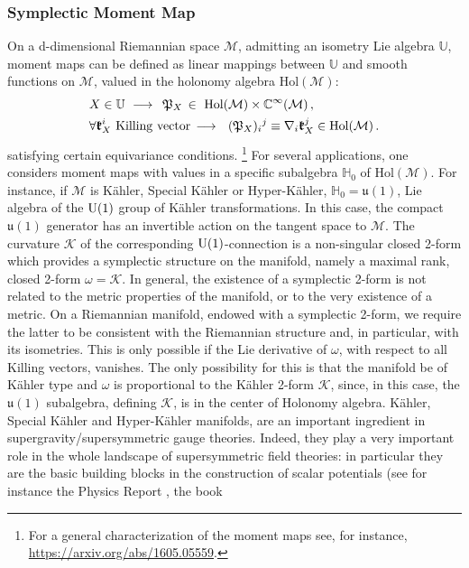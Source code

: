 \documentclass[10pt,a4paper]{article}
\begin{document}
\subsubsection{Symplectic Moment Map} {On a d-dimensional Riemannian space $\mathcal{M}$, admitting an isometry Lie algebra $\mathbb{U}$, moment maps can be defined as linear mappings between $\mathbb{U}$ and  smooth functions on $\mathcal{M}$, valued in the holonomy algebra $\mathrm{Hol}(\mathcal{M})$:
\begin{align}
&X\in \mathbb{U}\,\,\longrightarrow \,\,\,\mathfrak{P}_X\,\in \,\,\mathrm{Hol}(\mathcal{M})\times \mathbb{C}^\infty(\mathcal{M})\,,\nonumber\\
&\forall \boldsymbol{\mathfrak{k}}^i_X\,\,{\rm Killing\,\,vector}\,\longrightarrow\,\,\,\,(\mathfrak{P}_X)_i{}^j\equiv \nabla_i\boldsymbol{\mathfrak{k}}^j_X\in \mathrm{Hol}(\mathcal{M})\,.\end{align}
satisfying certain equivariance conditions. \footnote{{ For a general characterization of the moment maps see, for instance,} \url{https://arxiv.org/abs/1605.05559}.} For several applications, one considers moment maps with values in a specific subalgebra $\mathbb{H}_0$ of $\mathrm{Hol}(\mathcal{M})$. For instance, if $\mathcal{M}$ is  K\"ahler, Special K\"ahler or Hyper-K\"ahler, $\mathbb{H}_0=\mathfrak{u}(1)$, Lie algebra of the ${\rm U}(1)$ group of K\"ahler transformations. In this case, the compact $\mathfrak{u}(1)$ generator has an invertible action on the tangent space to $\mathcal{M}$. The curvature $\boldsymbol{\mathcal{K}}$ of the corresponding ${\rm U}(1)$-connection is a non-singular closed 2-form which provides a symplectic structure on the manifold, namely a maximal rank, closed 2-form $\omega=\boldsymbol{\mathcal{K}}$. In general, the existence of a symplectic 2-form is not related to the metric properties of the manifold, or to the very existence of a metric. On a Riemannian manifold, endowed with a symplectic 2-form, we require the latter to be consistent with the Riemannian structure and, in particular, with its isometries. This is only possible if the Lie derivative of $\omega$, with respect to all Killing vectors, vanishes. The only possibility for this is that the manifold be of K\"ahler type and $\omega$ is proportional to the K\"ahler 2-form $\boldsymbol{\mathcal{K}}$, since, in this case, the $\mathfrak{u}(1)$ subalgebra, defining $\boldsymbol{\mathcal{K}}$, is in the center of Holonomy algebra. K\"ahler, Special K\"ahler and  Hyper-K\"ahler manifolds, are an important ingredient in  supergravity/supersymmetric gauge theories.}  { Indeed, they }play a very important role in the whole landscape of supersymmetric field theories: in particular they are the basic building blocks in the construction of scalar potentials (see for instance the Physics Report \cite{Trigiante_2017}, the book \cite{advancio}
\end{document}
